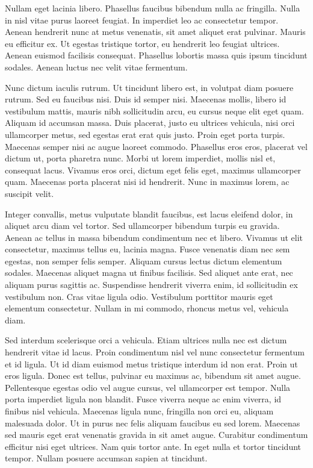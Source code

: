 \begin{btUnit}
Nullam eget lacinia libero. Phasellus faucibus bibendum nulla ac
fringilla. Nulla in nisl vitae purus laoreet feugiat. In imperdiet leo
ac consectetur tempor. Aenean hendrerit nunc at metus venenatis, sit
amet aliquet erat pulvinar. Mauris eu efficitur ex. Ut egestas
tristique tortor, eu hendrerit leo feugiat ultrices. Aenean euismod
facilisis consequat. Phasellus lobortis massa quis ipsum tincidunt
sodales. Aenean luctus nec velit vitae fermentum.

Nunc dictum iaculis rutrum. Ut tincidunt libero est, in volutpat diam
posuere rutrum. Sed eu faucibus nisi. Duis id semper nisi. Maecenas
mollis, libero id vestibulum mattis, mauris nibh sollicitudin arcu, eu
cursus neque elit eget quam. Aliquam id accumsan massa. Duis placerat,
justo eu ultrices vehicula, nisi orci ullamcorper metus, sed egestas
erat erat quis justo. Proin eget porta turpis. Maecenas semper nisi ac
augue laoreet commodo. Phasellus eros eros, placerat vel dictum ut,
porta pharetra nunc. Morbi ut lorem imperdiet, mollis nisl et,
consequat lacus. Vivamus eros orci, dictum eget felis eget, maximus
ullamcorper quam. Maecenas porta placerat nisi id hendrerit. Nunc in
maximus lorem, ac suscipit velit.

Integer convallis, metus vulputate blandit faucibus, est lacus
eleifend dolor, in aliquet arcu diam vel tortor. Sed ullamcorper
bibendum turpis eu gravida. Aenean ac tellus in massa bibendum
condimentum nec et libero. Vivamus ut elit consectetur, maximus tellus
eu, lacinia magna. Fusce venenatis diam nec sem egestas, non semper
felis semper. Aliquam cursus lectus dictum elementum sodales. Maecenas
aliquet magna ut finibus facilisis. Sed aliquet ante erat, nec aliquam
purus sagittis ac. Suspendisse hendrerit viverra enim, id sollicitudin
ex vestibulum non. Cras vitae ligula odio. Vestibulum porttitor mauris
eget elementum consectetur. Nullam in mi commodo, rhoncus metus vel,
vehicula diam.

Sed interdum scelerisque orci a vehicula. Etiam ultrices nulla nec est
dictum hendrerit vitae id lacus. Proin condimentum nisl vel nunc
consectetur fermentum et id ligula. Ut id diam euismod metus tristique
interdum id non erat. Proin ut eros ligula. Donec est tellus, pulvinar
eu maximus ac, bibendum sit amet augue. Pellentesque egestas odio vel
augue cursus, vel ullamcorper est tempor. Nulla porta imperdiet ligula
non blandit. Fusce viverra neque ac enim viverra, id finibus nisl
vehicula. Maecenas ligula nunc, fringilla non orci eu, aliquam
malesuada dolor. Ut in purus nec felis aliquam faucibus eu sed lorem.
Maecenas sed mauris eget erat venenatis gravida in sit amet augue.
Curabitur condimentum efficitur nisi eget ultrices. Nam quis tortor
ante. In eget nulla et tortor tincidunt tempor. Nullam posuere
accumsan sapien at tincidunt.


\end{btUnit}
